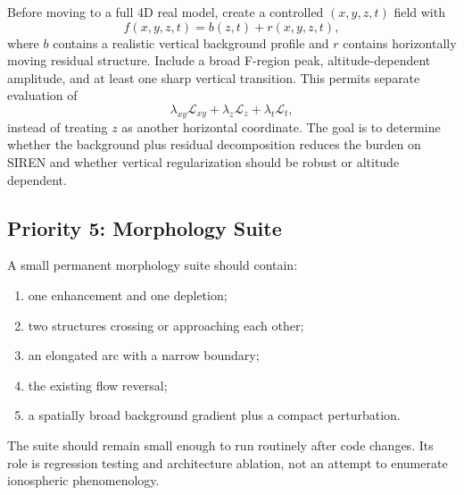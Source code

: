 \documentclass[11pt]{article}
\begin{document}
Before moving to a full 4D real model, create a controlled $(x,y,z,t)$ field with
\begin{equation}
  f(x,y,z,t) = b(z,t) + r(x,y,z,t),
\end{equation}
where $b$ contains a realistic vertical background profile and $r$ contains horizontally moving residual
structure. Include a broad F-region peak, altitude-dependent amplitude, and at least one sharp vertical
transition. This permits separate evaluation of
\begin{equation}
  \lambda_{xy}\mathcal L_{xy} + \lambda_z\mathcal L_z + \lambda_t\mathcal L_t,
\end{equation}
instead of treating $z$ as another horizontal coordinate. The goal is to determine whether the background
plus residual decomposition reduces the burden on SIREN and whether vertical regularization should be robust
or altitude dependent.

\subsection{Priority 5: Morphology Suite}

A small permanent morphology suite should contain:
\begin{enumerate}
  \item one enhancement and one depletion;
  \item two structures crossing or approaching each other;
  \item an elongated arc with a narrow boundary;
  \item the existing flow reversal;
  \item a spatially broad background gradient plus a compact perturbation.
\end{enumerate}
The suite should remain small enough to run routinely after code changes. Its role is regression testing and
architecture ablation, not an attempt to enumerate ionospheric phenomenology.
\end{document}
